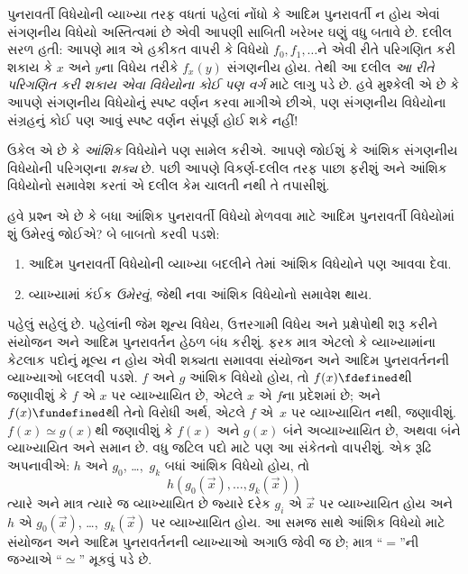 \documentclass[../../../include/open-logic-section]{subfiles}
\begin{document}


પુનરાવર્તી વિધેયોની વ્યાખ્યા તરફ વધતાં પહેલાં નોંધો કે આદિમ
પુનરાવર્તી ન હોય એવાં સંગણનીય વિધેયો અસ્તિત્વમાં છે એવી આપણી
સાબિતી ખરેખર ઘણું વધુ બતાવે છે. દલીલ સરળ હતી: આપણે માત્ર એ
હકીકત વાપરી કે વિધેયો $f_0,f_1,\dots$ને એવી રીતે પરિગણિત કરી
શકાય કે $x$ અને $y$ના વિધેય તરીકે $f_x(y)$ સંગણનીય હોય. તેથી
આ દલીલ \emph{આ રીતે પરિગણિત કરી શકાય એવા વિધેયોના કોઈ પણ વર્ગ}
માટે લાગુ પડે છે. હવે મુશ્કેલી એ છે કે આપણે સંગણનીય વિધેયોનું
સ્પષ્ટ વર્ણન કરવા માગીએ છીએ, પણ સંગણનીય વિધેયોના સંગ્રહનું કોઈ
પણ આવું સ્પષ્ટ વર્ણન સંપૂર્ણ હોઈ શકે નહીં!

ઉકેલ એ છે કે \emph{આંશિક} વિધેયોને પણ સામેલ કરીએ. આપણે જોઈશું કે
આંશિક સંગણનીય વિધેયોની પરિગણના \emph{શક્ય} છે.
પછી આપણે વિકર્ણ-દલીલ તરફ પાછા ફરીશું અને આંશિક વિધેયોનો
સમાવેશ કરતાં એ દલીલ કેમ ચાલતી નથી તે તપાસીશું.

હવે પ્રશ્ન એ છે કે બધા આંશિક પુનરાવર્તી વિધેયો મેળવવા માટે
આદિમ પુનરાવર્તી વિધેયોમાં શું ઉમેરવું જોઈએ? બે બાબતો કરવી પડશે:
\begin{enumerate}
\item આદિમ પુનરાવર્તી વિધેયોની વ્યાખ્યા બદલીને તેમાં આંશિક
  વિધેયોને પણ આવવા દેવા.
\item વ્યાખ્યામાં કંઈક \emph{ઉમેરવું}, જેથી નવા આંશિક વિધેયોનો
  સમાવેશ થાય.
\end{enumerate}

પહેલું સહેલું છે. પહેલાંની જેમ શૂન્ય વિધેય, ઉત્તરગામી વિધેય અને
પ્રક્ષેપોથી શરૂ કરીને સંયોજન અને આદિમ પુનરાવર્તન હેઠળ બંધ કરીશું.
ફરક માત્ર એટલો કે વ્યાખ્યામાંના કેટલાક પદોનું મૂલ્ય ન હોય એવી
શક્યતા સમાવવા સંયોજન અને આદિમ પુનરાવર્તનની વ્યાખ્યાઓ બદલવી પડશે.
$f$ અને $g$ આંશિક વિધેયો હોય, તો $f(x) \fdefined$થી જણાવીશું કે
$f$ એ $x$ પર વ્યાખ્યાયિત છે, એટલે $x$ એ $f$ના પ્રદેશમાં છે;
અને $f(x)
\fundefined$થી તેનો વિરોધી અર્થ, એટલે $f$ એ~$x$ પર
વ્યાખ્યાયિત નથી, જણાવીશું. $f(x) \simeq g(x)$થી જણાવીશું કે
$f(x)$ અને $g(x)$ બંને અવ્યાખ્યાયિત છે, અથવા બંને વ્યાખ્યાયિત
અને સમાન છે. વધુ જટિલ પદો માટે પણ આ સંકેતનો વાપરીશું. એક
રૂઢિ અપનાવીએ: $h$ અને $g_0$, \dots,~$g_k$ બધાં આંશિક
વિધેયો હોય, તો
\[
h(g_0(\vec x),\dots,g_k(\vec x))
\]
ત્યારે અને માત્ર ત્યારે જ વ્યાખ્યાયિત છે જ્યારે દરેક $g_i$ એ
$\vec x$ પર વ્યાખ્યાયિત હોય અને $h$ એ
$g_0(\vec x)$, \dots,~$g_k(\vec x)$ પર વ્યાખ્યાયિત હોય. આ
સમજ સાથે આંશિક વિધેયો માટે સંયોજન અને આદિમ પુનરાવર્તનની
વ્યાખ્યાઓ અગાઉ જેવી જ છે; માત્ર ``$=$''ની જગ્યાએ
``$\simeq$'' મૂકવું પડે છે.
\end{document}
